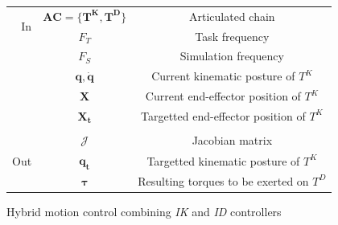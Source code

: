 \begin{algorithm}[H]
	\emph{}\;

	\begin{center}
		\begin{tabular}[3cm]{rcc}
			\multirow{2}{*}{In} & $\boldsymbol{AC} = \lbrace \boldsymbol{T^K}, \boldsymbol{T^D}\rbrace$ & Articulated chain \\
				& $F_T$ & Task frequency\\
				& $F_S$ & Simulation frequency\\
				& $\boldsymbol{q}, \boldsymbol{\dot{q}}$ & Current kinematic posture of $T^K$ \\
				& $\boldsymbol{X}$ & Current end-effector position of $T^K$ \\
				& $\boldsymbol{X_t}$ & Targetted end-effector position of $T^K$ \\
			\\
			\multirow{3}{*}{Out} & $\boldsymbol{\mathcal{J}}$ & Jacobian matrix \\
				& $\boldsymbol{q_t}$ & Targetted kinematic posture of $T^K$ \\
				& $\boldsymbol{\tau}$ & Resulting torques to be exerted on $T^D$ \\
		\end{tabular}\;
	\end{center}

	\emph{}\;

	\caption{Hybrid motion control combining \emph{IK} and \emph{ID} controllers}
	\label{alg:hybridControl}
\end{algorithm}

